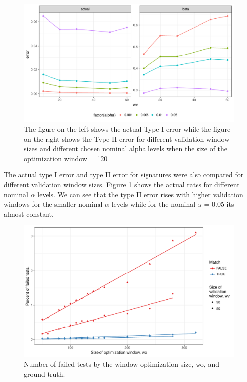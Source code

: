 \documentclass[12pt]{article}
\begin{document}
\begin{figure}

{\centering \includegraphics[width=\textwidth]{figures/wo120-1} 

}

\caption{The figure on the left shows the actual Type I error while the figure on the right shows the Type II error for different validation window sizes and different chosen nominal alpha levels when the size of the optimization window = 120}\label{fig:wo120}
\end{figure}

The actual type I error and type II error for signatures were also
compared for different validation window sizes. Figure \ref{fig:wo120}
shows the actual rates for different nominal \(\alpha\) levels. We can
see that the type II error rises with higher validation windows for the
smaller nominal \(\alpha\) levels while for the nominal \(\alpha\) =
0.05 its almost constant.

\begin{figure}

{\centering \includegraphics[width=\textwidth]{figures/missings-1} 

}

\caption{Number of failed tests by the window optimization size, wo, and ground truth.}\label{fig:missings}
\end{figure}
\end{document}
